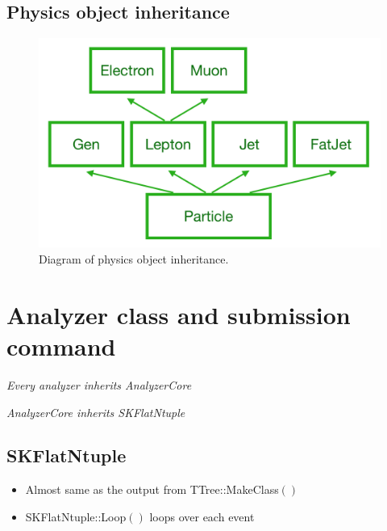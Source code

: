 \documentclass[12pt, a4paper, titlepage]{article}
\begin{document}
\clearpage

\subsection{Physics object inheritance}

\begin{figure}[htbp]
\centering
  \includegraphics[width=1.0\textwidth]{Figures/PhysicsObjectInheritance.png}
  \caption{
    Diagram of physics object inheritance.
  }
\end{figure}

\clearpage

\section{Analyzer class and submission command}

\centerline{\textit{Every analyzer inherits AnalyzerCore}}
\centerline{\textit{AnalyzerCore inherits SKFlatNtuple}}

\subsection{SKFlatNtuple}

\begin{itemize}
\item Almost same as the output from TTree::MakeClass$()$
\item SKFlatNtuple::Loop$()$ loops over each event
\end{itemize}
\end{document}
